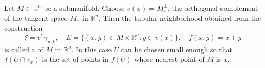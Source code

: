 Let $M \subset \mathbb{R}^n$ be a submanifold. Choose $v(x) = M_x^\perp$, the orthogonal complement of the tangent space $M_x$ in $\mathbb{R}^n$. Then the tubular neighborhood obtained from the construction
$$\xi = v^*\gamma_{n,k}, \quad E = \{(x,y) \in M \times \mathbb{R}^n : y \in v(x)\}, \quad f(x,y) = x + y$$
is called a  of $M$ in $\mathbb{R}^n$. In this case $U$ can be chosen small enough so that $f(U \cap v_x)$ is the set of points in $f(U)$ whose nearest point of $M$ is $x$.
